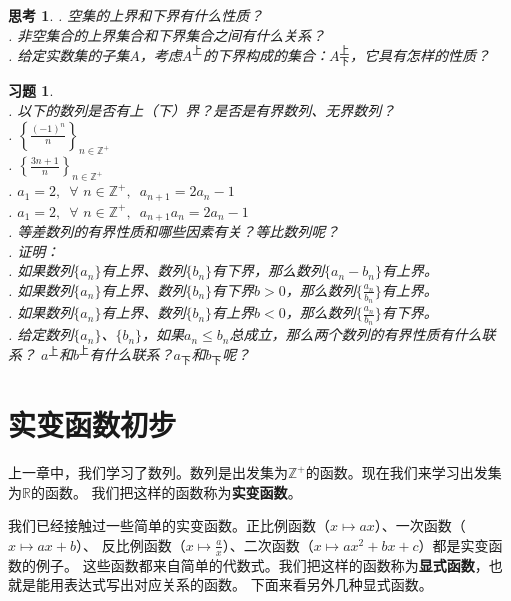 \documentclass[12pt,UTF8]{ctexbook}
\newtheorem{sk}{思考}[section]
\newtheorem{xt}{习题}[section]
\begin{document}
\begin{sk}
    . 空集的上界和下界有什么性质？\\
    . 非空集合的上界集合和下界集合之间有什么关系？\\
    . 给定实数集的子集$A$，考虑$A^{\text{上}}$的下界构成的集合：$A^{\text{上}}_{\text{下}}$，它具有怎样的性质？
\end{sk}
\begin{xt}
    \mbox{} \\
    . 以下的数列是否有上（下）界？是否是有界数列、无界数列？\\
    . $\left\{\frac{(-1)^n}{n}\right\}_{n\in\mathbb{Z}^+}$ \\
    . $\left\{\frac{3n + 1}{n}\right\}_{n\in\mathbb{Z}^+}$\\
    . $a_1 = 2, \,\,\, \forall \,\, n \in\mathbb{Z}^+, \,\,\, a_{n+1} = 2a_n - 1$\\
    . $a_1 = 2, \,\,\, \forall \,\, n \in\mathbb{Z}^+, \,\,\, a_{n+1}a_n = 2a_n - 1$\\
    . 等差数列的有界性质和哪些因素有关？等比数列呢？\\
    . 证明：\\
    . 如果数列$\{a_n\}$有上界、数列$\{b_n\}$有下界，那么数列$\{a_n - b_n\}$有上界。\\
    . 如果数列$\{a_n\}$有上界、数列$\{b_n\}$有下界$b>0$，那么数列$\{\frac{a_n}{b_n}\}$有上界。\\
    . 如果数列$\{a_n\}$有上界、数列$\{b_n\}$有上界$b<0$，那么数列$\{\frac{a_n}{b_n}\}$有下界。\\
    . 给定数列$\{a_n\}$、$\{b_n\}$，如果$a_n \leqslant b_n$总成立，那么两个数列的有界性质有什么联系？
    $a^{\text{上}}$和$b^{\text{上}}$有什么联系？$a_{\text{下}}$和$b_{\text{下}}$呢？
\end{xt}

\chapter{实变函数初步}

上一章中，我们学习了数列。数列是出发集为$\mathbb{Z}^+$的函数。现在我们来学习出发集为$\mathbb{R}$的函数。
我们把这样的函数称为\textbf{实变函数}。

我们已经接触过一些简单的实变函数。正比例函数（$x\mapsto ax$）、一次函数（$x\mapsto ax + b$）、
反比例函数（$x\mapsto \frac{a}{x}$）、二次函数（$x\mapsto ax^2 + bx + c$）都是实变函数的例子。
这些函数都来自简单的代数式。我们把这样的函数称为\textbf{显式函数}，也就是能用表达式写出对应关系的函数。
下面来看另外几种显式函数。
\end{document}
